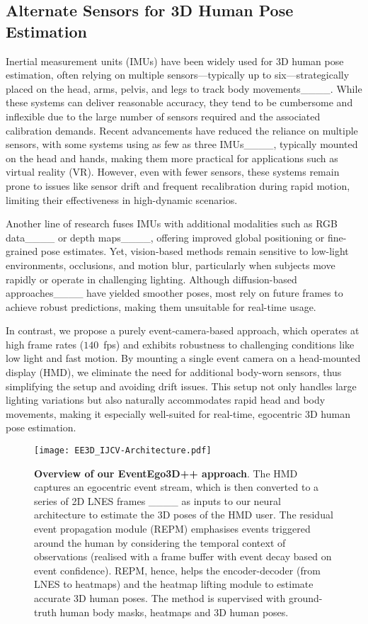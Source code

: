 \subsection{Alternate Sensors for 3D Human Pose Estimation} 
%
Inertial measurement units (IMUs) have been widely used for 3D human pose estimation, often relying on multiple sensors---typically up to six---strategically placed on the head, arms, pelvis, and legs to track body movements____.
%
While these systems can deliver reasonable accuracy, they tend to be cumbersome and inflexible due to the large number of sensors required and the associated calibration demands. 
%
Recent advancements have reduced the reliance on multiple sensors, with some systems using as few as three IMUs____, typically mounted on the head and hands, making them more practical for applications such as virtual reality (VR). 
%
However, even with fewer sensors, these systems remain prone to issues like sensor drift and frequent recalibration during rapid motion, limiting their effectiveness in high-dynamic scenarios.


Another line of research fuses IMUs with additional modalities such as RGB data____ or depth maps____, offering improved global positioning or fine-grained pose estimates. 
%
Yet, vision-based methods remain sensitive to low-light environments, occlusions, and motion blur, particularly when subjects move rapidly or operate in challenging lighting. 
%
Although diffusion-based approaches____ have yielded smoother poses, most rely on future frames to achieve robust predictions, making them unsuitable for real-time usage. 
%

In contrast, we propose a purely event-camera-based approach, which operates at high frame rates (\ie $140$~fps) and exhibits robustness to challenging conditions like low light and fast motion. 
%
By mounting a single event camera on a head-mounted display (HMD), we eliminate the need for additional body-worn sensors, thus simplifying the setup and avoiding drift issues. 
%
This setup not only handles large lighting variations but also naturally accommodates rapid head and body movements, making it especially well-suited for real-time, egocentric 3D human pose estimation.




\begin{figure*}[t]
\begin{center}
   \texttt{[image: EE3D\_IJCV-Architecture.pdf]}
\end{center}
    \caption{
    \textbf{Overview of our EventEgo3D++ approach}. 
    The HMD captures an egocentric event stream, which is then converted to a series of 2D LNES frames ____ as inputs to our neural architecture to estimate the 3D poses of the HMD user.
    The residual event propagation module (REPM) emphasises events triggered around the human by considering the temporal context of observations (realised with a frame buffer with event decay based on event confidence). 
    REPM, hence, helps the encoder-decoder (from LNES to heatmaps) and the heatmap lifting module to estimate accurate 3D human poses. 
    The method is supervised with ground-truth human body masks, heatmaps and 3D human poses.
}
\label{fig:eventego}
\end{figure*}